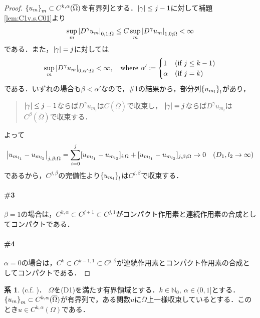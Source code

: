 \documentclass[a4paper]{ltjsarticle}
\newcommand{\Nset}{\mathbb{N}}
\newcommand{\Om}{\Omega}
\newcommand{\Ombar}{\overline{\Omega}}
\newcommand{\1}{\mathbbm{1}}
\numberwithin{equation}{section}
\theoremstyle{definition}
\newtheorem{cor}[thm]{系}
\begin{document}
\begin{proof}
    $\qty{u_m}_{m}\subset C^{k,\alpha}(\Ombar)$を有界列とする．$\abs{\gamma}\leq j-1$に対して補題\ref{lem:C1v.s.C01}より
    \begin{equation}
        \sup_{m}\abs{D^\gamma u_m}_{0,1;\Om}\leq C\sup_{m}\abs{D^\gamma u_m}_{1,0;\Om}<\infty 
    \end{equation}
    である．また，$\abs{\gamma}=j$に対しては
    \begin{equation}
        \sup_{m}\abs{D^\gamma u_m}_{0,\alpha';\Om}<\infty,\quad \text{where }\alpha'\coloneqq \begin{cases}
            1 & (\text{if }j\leq k-1)\\
            \alpha & (\text{if }j=k)
        \end{cases}
    \end{equation}
    である．いずれの場合も$\beta<\alpha'$なので，\#1の結果から，部分列$\qty{u_{m_l}}_l$があり，
    \begin{quote}
        $\abs{\gamma}\leq j-1$ならば$D^\gamma u_{m_l}$は$C(\Ombar)$で収束し，
        $\abs{\gamma}= j$ならば$D^\gamma u_{m_l}$は$C^\beta(\Ombar)$で収束する．
    \end{quote}
    よって
    \begin{equation}
        \abs{u_{m_{l_1}}-u_{m_{l_2}}}_{j,\beta;\Om}=\sum_{i=0}^{j}[u_{m_{l_1}}-u_{m_{l_2}}]_{i;\Om}+[u_{m_{l_1}}-u_{m_{l_2}}]_{j,\beta;\Om}\to 0\quad (D_1,l_2\to \infty)
    \end{equation}
    であるから，$C^{j,\beta}$の完備性より$\qty{u_{m_l}}_l$は$C^{j,\beta}$で収束する．

    \paragraph*{\#3}$\beta=1$の場合は，$C^{k,\alpha}\subset C^{j+1}\subset C^{j,1}$がコンパクト作用素と連続作用素の合成としてコンパクトである．

    \paragraph*{\#4}$\alpha=0$の場合は，$C^k\subset C^{k-1,1}\subset C^{j,\beta}$が連続作用素とコンパクト作用素の合成としてコンパクトである．
\end{proof}
\begin{cor}\label{cor:h8}(c.f. \cite[(H8)]{fr})．
    $\Om$を(D1)を満たす有界領域とする．$k\in\Nset_0,\ \alpha\in (0,1]$とする．$\qty{u_m}_m\subset C^{k,\alpha}(\Ombar)$が有界列で，ある関数$u$に$\Ombar$上一様収束しているとする．このとき$u\in C^{k,\alpha}(\Om)$である．
\end{cor}
\end{document}
